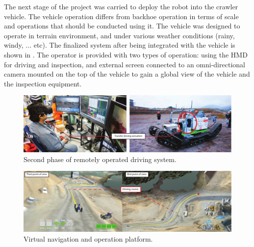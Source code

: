 The next stage of the project was carried to deploy the robot into the crawler vehicle. The vehicle operation differs from backhoe operation in terms of scale and operations that should be conducted using it. The vehicle was designed to operate in terrain environment, and under various weather conditions (rainy, windy, ... etc). The finalized system after being integrated with the vehicle is shown in . The operator is provided with two types of operation: using the HMD for driving and inspection, and external screen connected to an omni-directional camera mounted on the top of the vehicle to gain a global view of the vehicle and the inspection equipment.

\begin{figure}[htpb]
  \centering
	  \includegraphics[width=1\linewidth]{figures/eval/NEDO/Expermint2.pdf}
  \captionsetup{justification=centering}
  \caption{Second phase of remotely operated driving system.}
  \label{fig:usability-nedo-exp2}
\end{figure}

\begin{figure}[b!]
  \centering
	  \includegraphics[width=1\linewidth]{figures/eval/NEDO/simulator.pdf}
  \captionsetup{justification=centering}
  \caption{Virtual navigation and operation platform.}
  \label{fig:usability-nedo-simulator}
\end{figure}

